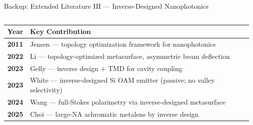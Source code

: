 \documentclass[aspectratio=169, 10pt]{beamer}
\begin{document}
\begin{frame}{Backup: Extended Literature III --- Inverse-Designed Nanophotonics}
  \begin{columns}[T]
      \small\renewcommand{\arraystretch}{1.15}
	  \begin{tabularx}{\linewidth}{>{\bfseries}c X}
        \toprule
        Year & Key Contribution \\
        \midrule
        \rowcolor{lightblue}
        2011 & Jensen --- topology optimization framework for nanophotonics \\
        2022 & Li --- topology-optimized metasurface, asymmetric beam deflection \\
        \rowcolor{lightblue}
        2023 & Gelly --- inverse design + TMD for cavity coupling \\
        2023 & White --- inverse-designed Si OAM emitter (passive; no valley selectivity) \\
        \rowcolor{lightblue}
        2024 & Wang --- full-Stokes polarimetry via inverse-designed metasurface \\
        2025 & Choi --- large-NA achromatic metalens by inverse design \\
        \bottomrule
      \end{tabularx}
  \end{columns}
\end{frame}



\end{document}
